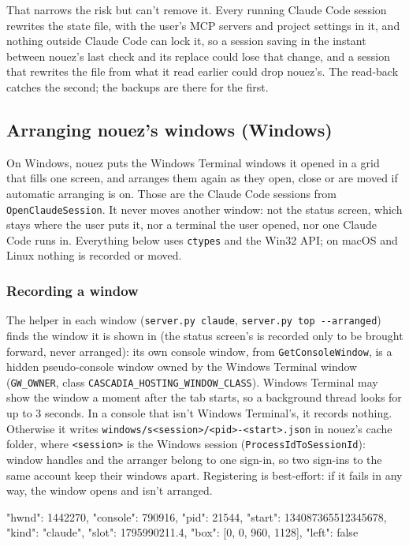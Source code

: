 \documentclass[10pt,a4paper]{article}
\newcommand{\code}[1]{\texttt{#1}}
\begin{document}
That narrows the risk but can't remove it. Every running Claude Code session rewrites the state
file, with the user's MCP servers and project settings in it, and nothing outside Claude Code can
lock it, so a session saving in the instant between nouez's last check and its replace could lose
that change, and a session that rewrites the file from what it read earlier could drop nouez's.
The read-back catches the second; the backups are there for the first.

\subsection{Arranging nouez's windows (Windows)}
\label{sec:arrange}

On Windows, nouez puts the Windows Terminal windows it opened in a grid that fills one screen, and
arranges them again as they open, close or are moved if automatic arranging is on. Those are the Claude Code sessions from
\code{OpenClaudeSession}. It never moves another window: not the status screen, which stays where
the user puts it, nor a terminal the user opened, nor one Claude Code runs in.
Everything below uses \code{ctypes} and the Win32 API; on macOS and Linux nothing is recorded or
moved.

\subsubsection*{Recording a window}

The helper in each window (\code{server.py claude}, \code{server.py top -{}-arranged}) finds the
window it is shown in (the status screen's is recorded only to be brought forward, never arranged): its own console window, from
\code{GetConsoleWindow}, is a hidden pseudo-console window owned by the Windows Terminal window
(\code{GW\_OWNER}, class \code{CASCADIA\_HOSTING\_WINDOW\_CLASS}). Windows Terminal may show the
window a moment after the tab starts, so a background thread looks for up to 3 seconds. In a
console that isn't Windows Terminal's, it records nothing. Otherwise it writes
\code{windows/s<session>/<pid>-<start>.json} in nouez's cache folder, where \code{<session>} is
the Windows session (\code{ProcessIdToSessionId}): window handles and the arranger belong to one
sign-in, so two sign-ins to the same account keep their windows apart. Registering is best-effort:
if it fails in any way, the window opens and isn't arranged.

\begin{wire}
{"hwnd": 1442270, "console": 790916, "pid": 21544, "start": 134087365512345678,
 "kind": "claude", "slot": 1795990211.4, "box": [0, 0, 960, 1128], "left": false}
\end{wire}
\end{document}
